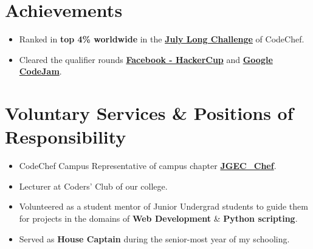 \documentclass[margin, centered, a4paper]{res}
\begin{document}
\begin{resume}

\section{Achievements}
\begin{itemize}[leftmargin=*]
	\item
	Ranked in \textbf{top 4\% worldwide} in the \textbf{\href{https://www.codechef.com/JULY17}{July Long Challenge}} of CodeChef.
	\item
	Cleared the qualifier rounds \textbf{\href{https://www.facebook.com/hackercup/}{Facebook - HackerCup}} and \textbf{\href{https://codejam.withgoogle.com/codejam/}{Google CodeJam}}.
	
	
\end{itemize}

\section{Voluntary Services \& Positions of Responsibility}
\begin{itemize}[leftmargin=*]
	\item
	CodeChef Campus Representative of campus chapter \textbf{\href{https://www.codechef.com/campus_chapter/JGEC_Chef}{JGEC\_Chef}}.
	\item
	Lecturer at Coders' Club of our college.
	\item
	Volunteered as a student mentor of Junior Undergrad students to guide them for projects in the domains of \textbf{Web Development} \& \textbf{Python scripting}.
	\item
	Served as \textbf{House Captain} during the senior-most year of my schooling.
\end{itemize}


\end{resume}
\end{document}
